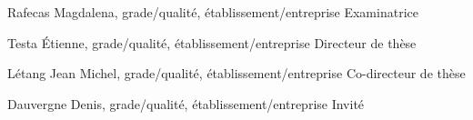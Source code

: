 Rafecas Magdalena, grade/qualit\'{e}, \'{e}tablissement/entreprise \hfill Examinatrice

\bigskip

Testa \'{E}tienne, grade/qualit\'{e}, \'{e}tablissement/entreprise \hfill Directeur de th\`{e}se

L\'{e}tang Jean Michel, grade/qualit\'{e}, \'{e}tablissement/entreprise \hfill Co-directeur de th\`{e}se %

Dauvergne Denis, grade/qualit\'{e}, \'{e}tablissement/entreprise \hfill Invit\'{e} %

\newpage

%